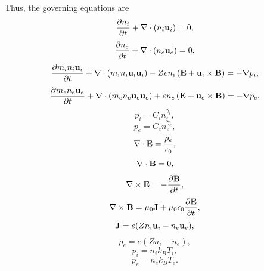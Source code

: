 \documentclass[a4paper,11pt]{report}
\begin{document}
Thus, the governing equations are
\begin{equation}
    \label{eq:pwaves_ion_density}
    \frac{\partial n_i}{\partial t} + \nabla \cdot \left (n_i \mathbf{u}_i \right ) = 0,
\end{equation}
\begin{equation}
    \label{eq:pwaves_electron_density}
    \frac{\partial n_e}{\partial t} + \nabla \cdot \left (n_e \mathbf{u}_e \right ) = 0,
\end{equation}
\begin{equation}
    \label{eq:pwaves_ion_momentum}
    \frac{\partial m_i n_i \mathbf{u}_i}{\partial t} + \nabla \cdot \left ( m_i n_i \mathbf{u}_i \mathbf{u}_i \right ) - Ze n_i \left ( \mathbf{E} + \mathbf{u}_i \times \mathbf{B} \right ) = -\nabla p_i,
\end{equation}
\begin{equation}
    \label{eq:pwaves_electron_momentum}
    \frac{\partial m_e n_e \mathbf{u}_e}{\partial t} + \nabla \cdot \left ( m_e n_e \mathbf{u}_e \mathbf{u}_e \right ) + e n_e \left ( \mathbf{E} + \mathbf{u}_e \times \mathbf{B} \right ) = -\nabla p_e,
\end{equation}
\begin{equation}
    \label{eq:pwaves_ion_pressure}
    p_i = C_i n_i^{\gamma_i},
\end{equation}
\begin{equation}
    \label{eq:pwaves_electron_pressure}
    p_e = C_e n_e^{\gamma_e},
\end{equation}
\begin{equation}
    \label{eq:pwaves_maxwell_3}
    \nabla \cdot \mathbf{E} = \frac{\rho_e}{\epsilon_0},
\end{equation}
\begin{equation}
    \label{eq:p_waves_maxwell_4}
    \nabla \cdot \mathbf{B} = 0,
\end{equation}
\begin{equation}
    \label{eq:p_waves_maxwell_1}
    \nabla \times \mathbf{E} = -\frac{ \partial \mathbf{B}}{\partial t},
\end{equation}
\begin{equation}
    \label{eq:p_waves_maxwell_2}
    \nabla \times \mathbf{B} = \mu_0 \mathbf{J} + \mu_0 \epsilon_0 \frac{\partial \mathbf{E}}{\partial t},
\end{equation}
\begin{equation}
    \label{eq:p_waves_curr_density}
    \mathbf{J} = e (Z n_i \mathbf{u}_i - n_e \mathbf{u}_e),
\end{equation}
\begin{equation}
    \label{eq:p_waves_mass_density}
    \rho_e = e (Z n_i - n_e),
\end{equation}
\begin{equation}
    p_i = n_i k_B T_i,
\end{equation}
\begin{equation}
    p_e = n_e k_B T_e.
\end{equation}
\end{document}
